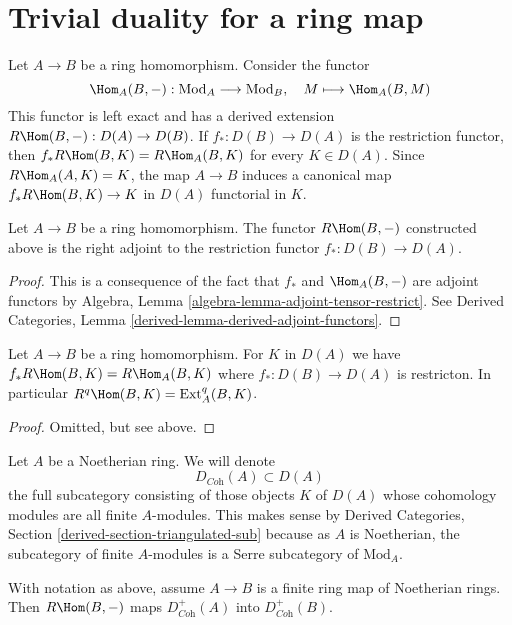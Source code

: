 \section{Trivial duality for a ring map}
\label{section-trivial}

\noindent
Let $A \to B$ be a ring homomorphism. Consider the functor
$$
\Hom_A(B, -) : \text{Mod}_A \longrightarrow \text{Mod}_B,\quad
M \longmapsto \Hom_A(B, M)
$$
This functor is left exact and has a derived extension
$R\Hom(B, -) : D(A) \to D(B)$. If $f_* : D(B) \to D(A)$ is the restriction
functor, then $f_*R\Hom(B, K) = R\Hom_A(B, K)$ for every $K \in D(A)$.
Since $R\Hom_A(A, K) = K$, the map $A \to B$ induces a canonical map
$f_*R\Hom(B, K) \to K$ in $D(A)$ functorial in $K$.

\begin{lemma}
\label{lemma-right-adjoint}
Let $A \to B$ be a ring homomorphism. The functor $R\Hom(B, -)$
constructed above is the right adjoint to the restriction functor
$f_* : D(B) \to D(A)$.
\end{lemma}

\begin{proof}
This is a consequence of the fact that $f_*$ and $\Hom_A(B, -)$ are
adjoint functors by Algebra, Lemma \ref{algebra-lemma-adjoint-tensor-restrict}.
See Derived Categories, Lemma \ref{derived-lemma-derived-adjoint-functors}.
\end{proof}

\begin{lemma}
\label{lemma-RHom-ext}
Let $A \to B$ be a ring homomorphism. For $K$ in $D(A)$ we have
$f_*R\Hom(B, K) = R\Hom_A(B, K)$ where $f_* : D(B) \to D(A)$ is
restricton. In particular $R^q\Hom(B, K) = \text{Ext}_A^q(B, K)$.
\end{lemma}

\begin{proof}
Omitted, but see above.
\end{proof}

\noindent
Let $A$ be a Noetherian ring. We will denote
$$
D_{\textit{Coh}}(A) \subset D(A)
$$
the full subcategory consisting of those objects $K$ of $D(A)$
whose cohomology modules are all finite $A$-modules. This makes sense
by Derived Categories, Section \ref{derived-section-triangulated-sub}
because as $A$ is Noetherian, the subcategory of finite $A$-modules
is a Serre subcategory of $\text{Mod}_A$.

\begin{lemma}
\label{lemma-exact-support-coherent}
With notation as above, assume $A \to B$ is a finite ring map of
Noetherian rings. Then $R\Hom(B, -)$ maps
$D^+_{\textit{Coh}}(A)$ into $D^+_{\textit{Coh}}(B)$.
\end{lemma}

